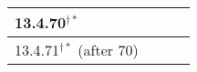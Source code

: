 \documentclass[12pt]{amsart}
\begin{document}
\begin{longtable}{p{4cm}|c|c|c}
        13.4.70$^{\dagger \ast}$               &                 & \\ \hline
        13.4.71$^{\dagger \ast}$ (after 70)    &                 & \\ \hline

\end{longtable}
\end{document}
